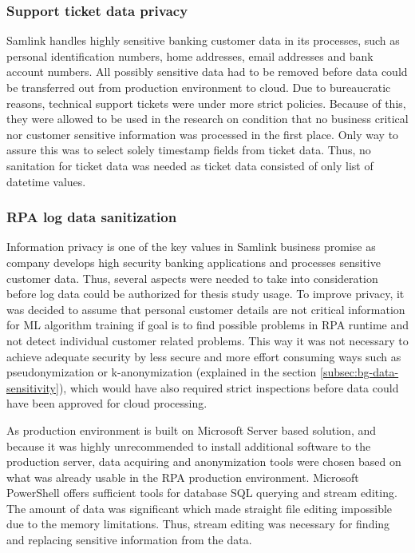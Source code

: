 \subsubsection*{Support ticket data privacy}
Samlink handles highly sensitive banking customer data in its processes,
such as personal identification numbers, home addresses, email addresses and bank account numbers.
All possibly sensitive data had to be removed
before data could be transferred out from production environment to cloud.
Due to bureaucratic reasons,
technical support tickets were under more strict policies.
Because of this,
they were allowed to be used in the research
on condition that no business critical nor customer sensitive information
was processed in the first place.
Only way to assure this
was to select solely timestamp fields from ticket data.
Thus, no sanitation for ticket data was needed
as ticket data consisted of only list of datetime values.


\subsubsection*{RPA log data sanitization}
Information privacy is one of the key values in Samlink business promise
as company develops high security banking applications
and processes sensitive customer data.
Thus, several aspects were needed to take into consideration
before log data could be authorized for thesis study usage.
To improve privacy,
it was decided to assume
that personal customer details are not critical information
for ML algorithm training
if goal is to find possible problems in RPA runtime
and not detect individual customer related problems.
This way it was not necessary to achieve adequate security
by less secure and more effort consuming ways
such as pseudonymization or k-anonymization
(explained in the section \ref{subsec:bg-data-sensitivity}), %
which would have also required strict inspections
before data could have been approved for cloud processing.

As production environment is built on Microsoft Server based solution,
and because it was highly unrecommended
to install additional software to the production server,
data acquiring and anonymization tools were chosen
based on what was already usable in the RPA production environment.
Microsoft PowerShell offers sufficient tools
for database SQL querying
and stream editing.
The amount of data was significant
which made straight file editing impossible
due to the memory limitations.
Thus, stream editing was necessary
for finding and replacing
sensitive information from the data.

